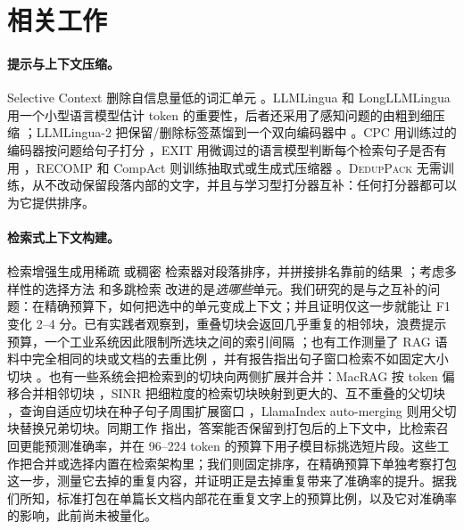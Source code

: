 \documentclass[11pt]{article}
\newcommand{\spk}{\textsc{DedupPack}}
\begin{document}
\section{相关工作}

\paragraph{提示与上下文压缩。}
Selective Context 删除自信息量低的词汇单元 \citep{li2023selectivecontext}。LLMLingua 和 LongLLMLingua 用一个小型语言模型估计 token 的重要性，后者还采用了感知问题的由粗到细压缩 \citep{jiang2023llmlingua,jiang2024longllmlingua}；LLMLingua-2 把保留/删除标签蒸馏到一个双向编码器中 \citep{pan2024llmlingua2}。CPC 用训练过的编码器按问题给句子打分 \citep{liskavets2025cpc}，EXIT 用微调过的语言模型判断每个检索句子是否有用 \citep{hwang2025exit}，RECOMP 和 CompAct 则训练抽取式或生成式压缩器 \citep{xu2023recomp,yoon2024compact}。\spk{} 无需训练，从不改动保留段落内部的文字，并且与学习型打分器互补：任何打分器都可以为它提供排序。

\paragraph{检索式上下文构建。}
检索增强生成用稀疏 \citep{robertson2009probabilistic} 或稠密 \citep{karpukhin2020dense,xiao2023cpack} 检索器对段落排序，并拼接排名靠前的结果 \citep{lewis2020retrieval,izacard2021leveraging}；考虑多样性的选择方法 \citep{carbonell1998mmr} 和多跳检索 \citep{xiong2021answering,trivedi2023interleaving} 改进的是\emph{选哪些}单元。我们研究的是与之互补的问题：在精确预算下，如何把选中的单元变成上下文；并且证明仅这一步就能让 F1 变化 2--4 分。已有实践者观察到，重叠切块会返回几乎重复的相邻块，浪费提示预算，一个工业系统因此限制所选块之间的索引间隔 \citep{sundar2026overlap}；也有工作测量了 RAG 语料中完全相同的块或文档的去重比例 \citep{bytedup2026}，并有报告指出句子窗口检索不如固定大小切块 \citep{eibich2024aragog}。也有一些系统会把检索到的切块向两侧扩展并合并：MacRAG 按 token 偏移合并相邻切块 \citep{lim2025macrag}，SINR 把细粒度的检索切块映射到更大的、互不重叠的父切块 \citep{nainwani2025search}，查询自适应切块在种子句子周围扩展窗口 \citep{rastogi2026qasc}，LlamaIndex auto-merging 则用父切块替换兄弟切块。同期工作 \citet{bala2026recall} 指出，答案能否保留到打包后的上下文中，比检索召回更能预测准确率，并在 96--224 token 的预算下用子模目标挑选短片段。这些工作把合并或选择内置在检索架构里；我们则固定排序，在精确预算下单独考察打包这一步，测量它去掉的重复内容，并证明正是去掉重复带来了准确率的提升。据我们所知，标准打包在单篇长文档内部花在重复文字上的预算比例，以及它对准确率的影响，此前尚未被量化。
\end{document}
